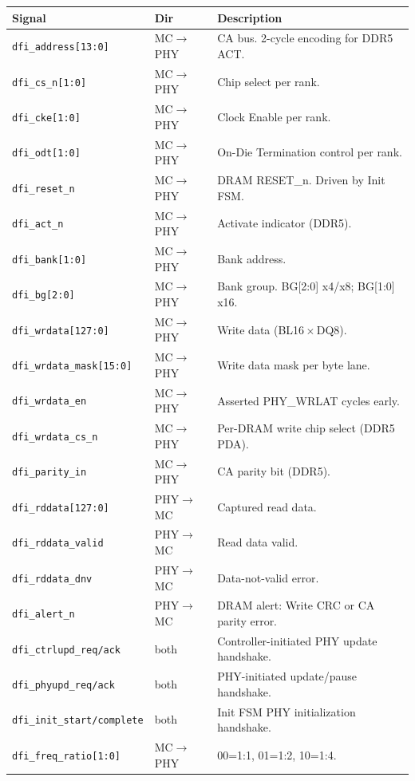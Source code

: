 \documentclass[10pt,a4paper]{article}
\newcommand{\Th}[1]{\cellcolor{thbg}\textbf{\small\color{acc1}#1}}
\newcommand{\RA}{\rowcolor{white}}
\newcommand{\RB}{\rowcolor{altbg}}
\begin{document}
\begin{center}
\begin{tabularx}{\linewidth}{@{} l l X @{}}
\toprule
\Th{Signal} & \Th{Dir} & \Th{Description} \\
\midrule
\RA \texttt{dfi\_address[13:0]}    & MC$\to$PHY & CA bus. 2-cycle encoding for DDR5 ACT. \\
\RB \texttt{dfi\_cs\_n[1:0]}       & MC$\to$PHY & Chip select per rank. \\
\RA \texttt{dfi\_cke[1:0]}         & MC$\to$PHY & Clock Enable per rank. \\
\RB \texttt{dfi\_odt[1:0]}         & MC$\to$PHY & On-Die Termination control per rank. \\
\RA \texttt{dfi\_reset\_n}         & MC$\to$PHY & DRAM RESET\_n. Driven by Init FSM. \\
\RB \texttt{dfi\_act\_n}           & MC$\to$PHY & Activate indicator (DDR5). \\
\RA \texttt{dfi\_bank[1:0]}        & MC$\to$PHY & Bank address. \\
\RB \texttt{dfi\_bg[2:0]}          & MC$\to$PHY & Bank group. BG[2:0] x4/x8; BG[1:0] x16. \\
\RA \texttt{dfi\_wrdata[127:0]}    & MC$\to$PHY & Write data (BL16\,$\times$\,DQ8). \\
\RB \texttt{dfi\_wrdata\_mask[15:0]}& MC$\to$PHY & Write data mask per byte lane. \\
\RA \texttt{dfi\_wrdata\_en}       & MC$\to$PHY & Asserted PHY\_WRLAT cycles early. \\
\RB \texttt{dfi\_wrdata\_cs\_n}    & MC$\to$PHY & Per-DRAM write chip select (DDR5 PDA). \\
\RA \texttt{dfi\_parity\_in}       & MC$\to$PHY & CA parity bit (DDR5). \\
\RB \texttt{dfi\_rddata[127:0]}    & PHY$\to$MC & Captured read data. \\
\RA \texttt{dfi\_rddata\_valid}    & PHY$\to$MC & Read data valid. \\
\RB \texttt{dfi\_rddata\_dnv}      & PHY$\to$MC & Data-not-valid error. \\
\RA \texttt{dfi\_alert\_n}         & PHY$\to$MC & DRAM alert: Write CRC or CA parity error. \\
\RB \texttt{dfi\_ctrlupd\_req/ack} & both & Controller-initiated PHY update handshake. \\
\RA \texttt{dfi\_phyupd\_req/ack}  & both & PHY-initiated update/pause handshake. \\
\RB \texttt{dfi\_init\_start/complete}& both & Init FSM PHY initialization handshake. \\
\RA \texttt{dfi\_freq\_ratio[1:0]} & MC$\to$PHY & 00=1:1, 01=1:2, 10=1:4. \\
\bottomrule
\end{tabularx}
\end{center}
\end{document}
